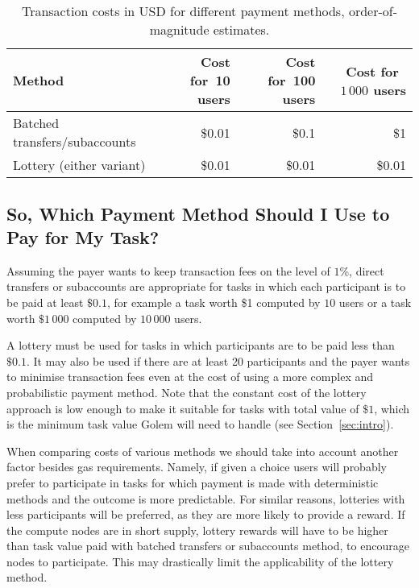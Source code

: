 \documentclass[a4paper]{article}
\begin{document}
    \begin{table}
      \centering ~\\~\\  %
      \begin{tabular}{lrrr} 
        \hline
        Method              & Cost for~10 users & Cost for~100 users & Cost for~$1\,000$ users \\ \hline
        Batched transfers/subaccounts  & ~ \$0.01          & ~ \$0.1            & ~ \$1    \\ %
        Lottery (either variant)       & ~ \$0.01          & ~ \$0.01           & ~ \$0.01 \\ \hline
      \end{tabular}
      \caption{Transaction costs in USD for different payment methods, order-of-magnitude estimates.}
      \label{table:costs-usd}
    \end{table}

    \subsection{So, Which Payment Method Should I Use to Pay for My Task?}
    Assuming the payer wants to keep transaction fees on the level of $1\%$,
    direct transfers or subaccounts are appropriate for tasks in which
    each participant is to be paid at least $\$0.1$, for example a
    task worth \$1 computed by $10$ users or a task worth $\$1\,000$
    computed by $10\,000$ users.

    A lottery must be used for tasks in which participants are to be paid less than $\$0.1$.
    It may also be used if there are at least 20 participants and the payer wants to
    minimise transaction fees even at the cost of using a more complex and probabilistic payment method.
    Note that the constant cost of the lottery approach is low enough to make it suitable for tasks with
    total value of $\$1$, which is the minimum task value Golem will need to handle (see Section~\ref{sec:intro}).

    When comparing costs of various methods we should take into account another factor besides gas requirements.
    Namely, if given a choice users will probably prefer to participate in tasks for which payment is made with
    deterministic methods and the outcome is more predictable. For similar reasons, lotteries with less participants
    will be preferred, as they are more likely to provide a reward.
    If the compute nodes are in short supply, lottery rewards will have to be higher than task value paid with
    batched transfers or subaccounts method, to encourage nodes to participate. This may drastically limit the
    applicability of the lottery method.
\end{document}
